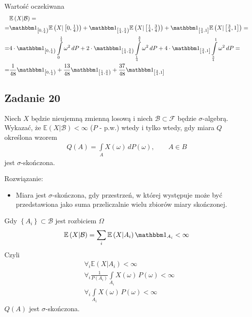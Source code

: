 Wartość oczekiwana
\begin{align*}
&\mathbb E \left(X|\mathcal B\right)
=\\=&
\mathbbm1_{\left[0,\frac{1}{4}\right)}
\mathbb E \left(X|\left[0,\tfrac{1}{4}\right)\right)+
\mathbbm1_{\left[\frac{1}{4},\frac{3}{4}\right)}
\mathbb E \left(X|\left[\tfrac{1}{4},\tfrac{3}{4}\right)\right)+
\mathbbm1_{\left[\frac{3}{4},1\right]}
\mathbb E \left(X|\left[\tfrac{3}{4},1\right]\right)
=\\=&
4\cdot\mathbbm1_{\left[0,\frac{1}{4}\right)}
\int\limits_{0}^{\frac{1}{4}}\omega^2\,dP+
2\cdot\mathbbm1_{\left[\frac{1}{4},\frac{3}{4}\right)}
\int\limits_{\frac{1}{4}}^{\frac{3}{4}}\omega^2\,dP+
4\cdot\mathbbm1_{\left[\frac{3}{4},1\right]}
\int\limits_{\frac{3}{4}}^1\omega^2\,dP
=\\=&
\frac{1}{48}\mathbbm1_{\left[0,\frac{1}{4}\right)}+
\frac{13}{48}\mathbbm1_{\left[\frac{1}{4},\frac{3}{4}\right)}+
\frac{37}{48}\mathbbm1_{\left[\frac{3}{4},1\right]}
\end{align*}


\subsection*{Zadanie 20}
Niech $ X $ będzie nieujemną zmienną losową i niech $ \mathcal B\subset \mathcal F  $ będzie $ \sigma $-algebrą. Wykazać, że $ \mathbb E \left(X|\mathcal B\right)<\infty  $ ($ P $ - p.w.) wtedy i tylko wtedy, gdy miara $ Q $ określona wzorem
\begin{gather*}
Q(A)=\int\limits_{A}X(\omega)\,dP(\omega),\qquad
A\in B
\end{gather*}
jest $ \sigma $-skończona.

Rozwiązanie:
\begin{itemize}
\item Miara jest $ \sigma $-skończona, gdy przestrzeń, w której występuje może być przedstawiona jako suma przeliczalnie wielu zbiorów miary skończonej.
\end{itemize}
Gdy $ \left\{A_i\right\} \subset\mathcal B $ jest rozbiciem $ \Omega $
\begin{gather*}
\mathbb E \left(X|\mathcal B\right)=\sum_i \mathbb E \left(X|A_i\right)\mathbbm1_{A_i}<\infty 
\end{gather*}
Czyli
\begin{align*}
&\forall_i \mathbb E \left(X|A_i\right)<\infty \\
&\forall_i \frac{1}{P\left(A_i\right)}\int\limits_{A_i}X(\omega)\,P(\omega)<\infty \\
&\forall_i \int\limits_{A_i}X(\omega)\,P(\omega)<\infty
\end{align*}
$ Q(A) $ jest $ \sigma $-skończona.

